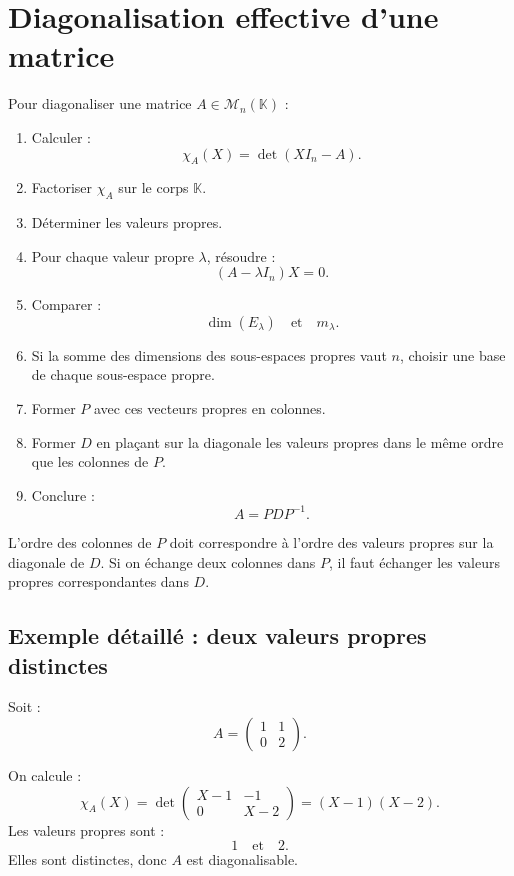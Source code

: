 \documentclass[11pt,a4paper]{article}
\newcommand{\K}{\mathbb K}
\newcommand{\M}{\mathcal M}
\begin{document}
\section{Diagonalisation effective d'une matrice}

\begin{methodbox}
Pour diagonaliser une matrice \(A\in\M_n(\K)\) :
\begin{enumerate}
    \item Calculer :
    \[
    \chi_A(X)=\det(XI_n-A).
    \]
    \item Factoriser \(\chi_A\) sur le corps \(\K\).
    \item Déterminer les valeurs propres.
    \item Pour chaque valeur propre \(\lambda\), résoudre :
    \[
    (A-\lambda I_n)X=0.
    \]
    \item Comparer :
    \[
    \dim(E_\lambda)
    \quad\text{et}\quad
    m_\lambda.
    \]
    \item Si la somme des dimensions des sous-espaces propres vaut \(n\), choisir une base de chaque sous-espace propre.
    \item Former \(P\) avec ces vecteurs propres en colonnes.
    \item Former \(D\) en plaçant sur la diagonale les valeurs propres dans le même ordre que les colonnes de \(P\).
    \item Conclure :
    \[
    A=PDP^{-1}.
    \]
\end{enumerate}
\end{methodbox}

\begin{erreurbox}
L'ordre des colonnes de \(P\) doit correspondre à l'ordre des valeurs propres sur la diagonale de \(D\).  
Si on échange deux colonnes dans \(P\), il faut échanger les valeurs propres correspondantes dans \(D\).
\end{erreurbox}

\subsection{Exemple détaillé : deux valeurs propres distinctes}

Soit :
\[
A=
\begin{pmatrix}
1&1\\
0&2
\end{pmatrix}.
\]

On calcule :
\[
\chi_A(X)=
\det
\begin{pmatrix}
X-1&-1\\
0&X-2
\end{pmatrix}
=
(X-1)(X-2).
\]
Les valeurs propres sont :
\[
1
\quad\text{et}\quad
2.
\]
Elles sont distinctes, donc \(A\) est diagonalisable.
\end{document}

